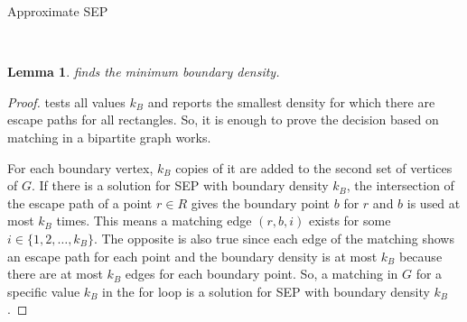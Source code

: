 \documentclass[preprint,12pt]{elsarticle}
\newtheorem{lemma}{Lemma}
\newcommand{\size}[1]{\lvert #1 \rvert}
\begin{document}
\begin{algorithm}[h]
\caption{Approximate SEP}
\label{alg:approx}
\begin{algorithmic}[1]
\Require {}
\Ensure {}
\EndFor
{}
\If{$\size{M}=\size{R}$}
\EndIf
\EndFor
{}
\EndFor
\\ 
\end{algorithmic}
\end{algorithm}
%


\begin{lemma}\label{lemma:boundary}
 finds the minimum boundary density.
\end{lemma}
\begin{proof}
 tests all values $k_B$ and reports the smallest density for which there are escape paths for all rectangles. So, it is enough to prove the decision based on matching in a bipartite graph works.

For each boundary vertex, $k_B$ copies of it are added to the second set of vertices of $G$. If there is a solution for SEP with boundary density $k_B$, the intersection of the escape path of a point $r\in R$ gives the boundary point $b$ for $r$ and $b$ is used at most $k_B$ times.
This means a matching edge $(r,b,i)$ exists for some $i\in \{1,2,\ldots,k_B\}$. The opposite is also true since each edge of the matching shows an escape path for each point and the boundary density is at most $k_B$ because there are at most $k_B$ edges for each boundary point. So, a matching in $G$ for a specific value $k_B$ in the for loop is a solution for SEP with boundary density $k_B$.
\end{proof}
\end{document}
